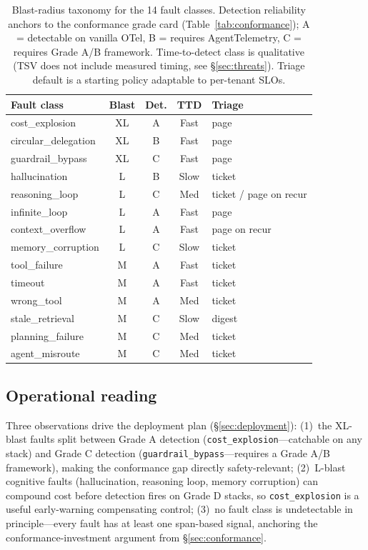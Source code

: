 \documentclass[conference]{IEEEtran}
\begin{document}
\begin{table}[t]
\centering
\scriptsize
\caption{Blast-radius taxonomy for the 14 fault classes. Detection
reliability anchors to the conformance grade card
(Table~\ref{tab:conformance}); A = detectable on vanilla OTel,
B = requires AgentTelemetry, C = requires Grade A/B framework.
Time-to-detect class is qualitative (TSV does not include measured
timing, see \S\ref{sec:threats}). Triage default is a
starting policy adaptable to per-tenant SLOs.}
\label{tab:blastradius}
\begin{tabular}{@{}lcccl@{}}
\toprule
\textbf{Fault class} & \textbf{Blast} & \textbf{Det.} & \textbf{TTD} & \textbf{Triage} \\
\midrule
cost\_explosion       & XL & A & Fast & page \\
circular\_delegation  & XL & B & Fast & page \\
guardrail\_bypass     & XL & C & Fast & page \\
hallucination         & L  & B & Slow & ticket \\
reasoning\_loop       & L  & C & Med  & ticket / page on recur \\
infinite\_loop        & L  & A & Fast & page \\
context\_overflow     & L  & A & Fast & page on recur \\
memory\_corruption    & L  & C & Slow & ticket \\
tool\_failure         & M  & A & Fast & ticket \\
timeout               & M  & A & Fast & ticket \\
wrong\_tool           & M  & A & Med  & ticket \\
stale\_retrieval      & M  & C & Slow & digest \\
planning\_failure     & M  & C & Med  & ticket \\
agent\_misroute       & M  & C & Med  & ticket \\
\bottomrule
\end{tabular}
\end{table}

\subsection{Operational reading}

Three observations drive the deployment plan
(\S\ref{sec:deployment}): (1)~the XL-blast faults split between
Grade A detection (\texttt{cost\_explosion}---catchable on any
stack) and Grade C detection (\texttt{guardrail\_bypass}---requires
a Grade A/B framework), making the conformance gap directly
safety-relevant; (2)~L-blast cognitive faults (hallucination,
reasoning loop, memory corruption) can compound cost before
detection fires on Grade D stacks, so \texttt{cost\_explosion} is a
useful early-warning compensating control; (3)~no fault class is
undetectable in principle---every fault has at least one
span-based signal, anchoring the conformance-investment argument
from \S\ref{sec:conformance}.
\end{document}

